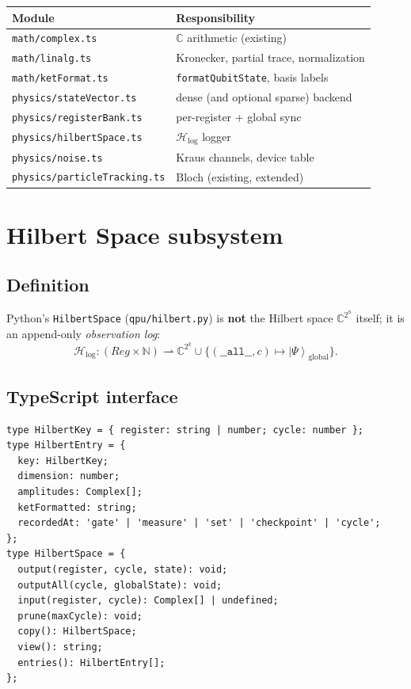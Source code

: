 \documentclass[11pt,a4paper]{article}
\newcommand{\C}{\mathbb{C}}
\newcommand{\ket}[1]{\left|#1\right\rangle}
\newcommand{\HS}{\mathcal{H}_{\mathrm{log}}}
\begin{document}
\begin{center}
\begin{tabular}{@{}ll@{}}
\toprule
Module & Responsibility \\
\midrule
\texttt{math/complex.ts} & $\C$ arithmetic (existing) \\
\texttt{math/linalg.ts} & Kronecker, partial trace, normalization \\
\texttt{math/ketFormat.ts} & \texttt{formatQubitState}, basis labels \\
\texttt{physics/stateVector.ts} & dense (and optional sparse) backend \\
\texttt{physics/registerBank.ts} & per-register + global sync \\
\texttt{physics/hilbertSpace.ts} & $\HS$ logger \\
\texttt{physics/noise.ts} & Kraus channels, device table \\
\texttt{physics/particleTracking.ts} & Bloch (existing, extended) \\
\bottomrule
\end{tabular}
\end{center}

\section{Hilbert Space subsystem}

\subsection{Definition}

Python's \texttt{HilbertSpace} (\texttt{qpu/hilbert.py}) is \textbf{not} the Hilbert space $\C^{2^n}$ itself; it is an append-only \emph{observation log}:
\begin{equation}
  \HS \colon (\mathit{Reg} \times \mathbb{N}) \rightharpoonup \C^{2^k}
  \cup \{(\texttt{\_\_all\_\_}, c) \mapsto \ket{\Psi}_{\mathrm{global}}\}.
\end{equation}

\subsection{TypeScript interface}

\begin{lstlisting}[style=protocol]
type HilbertKey = { register: string | number; cycle: number };
type HilbertEntry = {
  key: HilbertKey;
  dimension: number;
  amplitudes: Complex[];
  ketFormatted: string;
  recordedAt: 'gate' | 'measure' | 'set' | 'checkpoint' | 'cycle';
};
type HilbertSpace = {
  output(register, cycle, state): void;
  outputAll(cycle, globalState): void;
  input(register, cycle): Complex[] | undefined;
  prune(maxCycle): void;
  copy(): HilbertSpace;
  view(): string;
  entries(): HilbertEntry[];
};
\end{lstlisting}
\end{document}
